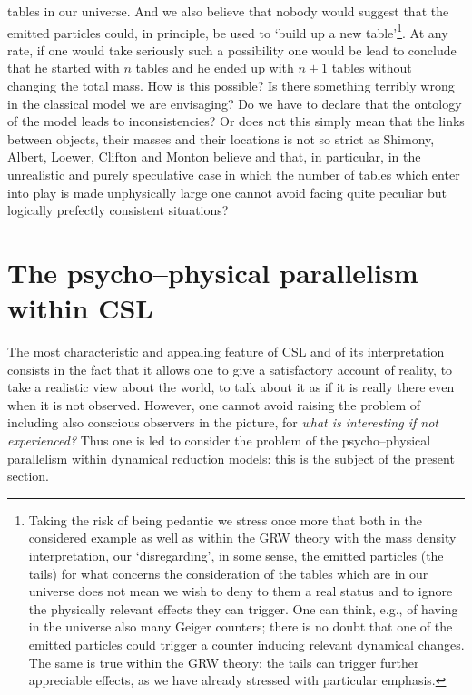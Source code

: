 \documentclass[12pt]{article}
\begin{document}
tables in our universe. And we also believe that nobody would
suggest that the emitted particles could, in principle, be used to
`build up a new table'\footnote{Taking the risk of being pedantic
we stress once more that both in the considered example as well as
within the GRW theory with the mass density interpretation, our
 `disregarding', in some sense, the emitted
particles (the tails) for what concerns the consideration of the
tables which are in our universe does not mean we wish  to deny to
them a real status and to ignore the physically relevant effects
they can trigger. One can think, e.g., of having in the universe
also many Geiger counters; there is no doubt that one of the
emitted particles could trigger a counter inducing relevant
dynamical changes. The same is true within the GRW theory: the
tails can trigger further appreciable effects, as we have already
stressed with particular emphasis.}. At any rate, if one would
take seriously such a possibility one would be lead to conclude
that he started with $n$ tables and he ended up with $n+1$ tables
without changing the total mass. How is this possible? Is there
something terribly wrong in the classical model we are envisaging?
Do we have to declare that the ontology of the model leads to
inconsistencies? Or does not this simply mean that the links
between objects, their masses and their locations is not so strict
as Shimony, Albert, Loewer, Clifton and Monton believe and that,
in particular, in the unrealistic and purely speculative case in
which the number of tables which enter into play is made
unphysically large one cannot avoid facing quite peculiar but
logically prefectly consistent situations?


\section{The psycho--physical parallelism within CSL}
\label{sec014}


The most characteristic and appealing feature of CSL and of its
interpretation consists in the fact that it allows one to give a
satisfactory account of reality, to take a realistic view about
the world, to talk about it as if it is really there even when it
is not observed. However, one cannot avoid raising the problem of
including also conscious observers in the picture, for
\cite{bellqg} {\it what is interesting if not experienced?} Thus
one is led to consider the problem of the psycho--physical
parallelism within dynamical reduction models: this is the subject
of the present section.
\end{document}
